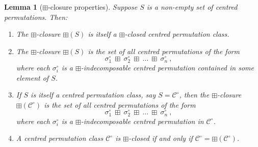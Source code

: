 \documentclass[11pt,a4paper]{article}
\newtheorem{lemma}[thm]{Lemma}
\theoremstyle{definition}
\begin{document}
\begin{lemma}[$\boxplus$-closure properties] \label{lemma:boxprops}
Suppose $S$ is a non-empty set of centred permutations. Then:
\begin{enumerate}
\item The $\boxplus$-closure $\boxplus(S)$ is itself a $\boxplus$-closed centred permutation class. \label{lemma:boxprops1}
\item The $\boxplus$-closure $\boxplus(S)$ is the set of all centred permutations of the form \label{lemma:boxprops2}
\[
\sigma^{\circ}_{1} \ \boxplus \ \sigma^{\circ}_{2} \ \boxplus \ \dots \ \boxplus \ \sigma^{\circ}_{n} \ ,
\]
where each $\sigma^{\circ}_{i}$ is a $\boxplus$-indecomposable centred permutation contained in some element of $S$.
\item If $S$ is itself a centred permutation class, say $S = \mathcal{C}^{\circ}$, then the $\boxplus$-closure $\boxplus(\mathcal{C}^{\circ})$ is the set of all centred permutations of the form \label{lemma:boxprops3}
\[
\sigma^{\circ}_{1} \ \boxplus \ \sigma^{\circ}_{2} \ \boxplus \ \dots \ \boxplus \ \sigma^{\circ}_{n} \ ,
\]
where each $\sigma^{\circ}_{i}$ is a $\boxplus$-indecomposable centred permutation in $\mathcal{C}^{\circ}$.
\item A centred permutation class $\mathcal{C}^{\circ}$ is $\boxplus$-closed if and only if $\mathcal{C}^{\circ} = \boxplus(\mathcal{C}^{\circ})$. \label{lemma:boxprops4}
\end{enumerate}
\end{lemma}
\end{document}
